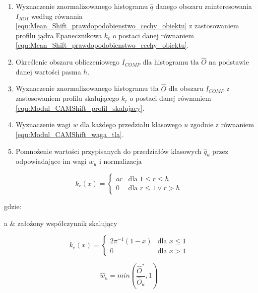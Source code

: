 \begin{enumerate}

	\item Wyznaczenie  znormalizowanego histogramu $\hat{q}$ danego obszaru zainteresowania $I_{ROI}$ według równania \ref{equ:Mean_Shift_prawdopodobienstwo_cechy_obiektu} z zastosowaniem profilu jądra Epanecznikowa $k_e$  o postaci danej równaniem \ref{equ:Mean_Shift_prawdopodobienstwo_cechy_obiektu}.
	\item Określenie obszaru obliczeniowego $I_{COMP}$ dla histogramu tła $\hat{O}$ na podstawie danej wartości pasma $h$.
	\item Wyznaczenie znormalizowanego histogramu tła $\hat{O}$ dla obszaru  $I_{COMP}$ z zastosowaniem profilu skalującego $k_r$  o postaci danej równaniem \ref{equ:Modul_CAMShift_profil_skalujacy}.
	\item Wyznaczenie wagi $w$ dla każdego przedziału klasowego $u$ zgodnie z równaniem \ref{equ:Modul_CAMShift_waga_tla}.
	\item Pomnożenie wartości przypisanych do przedziałów klasowych  $\hat{q}_u$ przez odpowiadające im wagi $w_u$ i normalizacja 
	
\end{enumerate}

\begin{equation}
\label{equ:Modul_CAMShift_profil_skalujacy}
	k_r(x) = 
	\begin{cases}
		a r  & \text{dla } 1 \le r \leq  h \\
		0 & \text{dla } r \leq 1 \lor r > h
	\end{cases}
\end{equation}

\noindent
gdzie:
\begin{conditions}
	 a & założony współczynnik skalujący  \\
\end{conditions}

\begin{equation}
\label{equ:Modul_CAMShift_profil_epanecznikowa}
	k_e(x) = 
	\begin{cases}
		2 \pi^{-1} (1 - x) & \text{dla } x \leq 1 \\
		0 & \text{dla } x > 1
	\end{cases}
\end{equation}

\begin{equation}
\label{equ:Modul_CAMShift_waga_tla}
	\hat{w}_u = min \left( \frac{\hat{O}^*}{\hat{O}_u}, 1 \right)
\end{equation}

